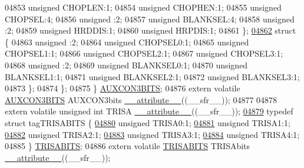 \begin{DoxyCode}
04853       \textcolor{keywordtype}{unsigned} CHOPLEN:1;
04854       \textcolor{keywordtype}{unsigned} CHOPHEN:1;
04855       \textcolor{keywordtype}{unsigned} CHOPSEL:4;
04856       \textcolor{keywordtype}{unsigned} :2;
04857       \textcolor{keywordtype}{unsigned} BLANKSEL:4;
04858       \textcolor{keywordtype}{unsigned} :2;
04859       \textcolor{keywordtype}{unsigned} HRDDIS:1;
04860       \textcolor{keywordtype}{unsigned} HRPDIS:1;
04861     \};
\hypertarget{a00009_source_l04862}{}\hyperlink{a00009}{04862}     \textcolor{keyword}{struct }\{
04863       \textcolor{keywordtype}{unsigned} :2;
04864       \textcolor{keywordtype}{unsigned} CHOPSEL0:1;
04865       \textcolor{keywordtype}{unsigned} CHOPSEL1:1;
04866       \textcolor{keywordtype}{unsigned} CHOPSEL2:1;
04867       \textcolor{keywordtype}{unsigned} CHOPSEL3:1;
04868       \textcolor{keywordtype}{unsigned} :2;
04869       \textcolor{keywordtype}{unsigned} BLANKSEL0:1;
04870       \textcolor{keywordtype}{unsigned} BLANKSEL1:1;
04871       \textcolor{keywordtype}{unsigned} BLANKSEL2:1;
04872       \textcolor{keywordtype}{unsigned} BLANKSEL3:1;
04873     \};
04874   \};
04875 \} \hyperlink{a00008_d2/da3/a00115}{AUXCON3BITS};
04876 \textcolor{keyword}{extern} \textcolor{keyword}{volatile} \hyperlink{a00008_d2/da3/a00115}{AUXCON3BITS} AUXCON3bits \hyperlink{a00009_a493c46f03454991ccc5aa7a6e1dfb2a7}{\_\_attribute\_\_}((\_\_sfr\_\_));
04877 
04878 \textcolor{keyword}{extern} \textcolor{keyword}{volatile} \textcolor{keywordtype}{unsigned} \textcolor{keywordtype}{int}  TRISA \hyperlink{a00009_a493c46f03454991ccc5aa7a6e1dfb2a7}{\_\_attribute\_\_}((\_\_sfr\_\_));
\hypertarget{a00009_source_l04879}{}\hyperlink{a00008}{04879} \textcolor{keyword}{typedef} \textcolor{keyword}{struct }tagTRISABITS \{
\hypertarget{a00009_source_l04880}{}\hyperlink{a00008_a5b058659efa978bacb96a404cfdbe610}{04880}   \textcolor{keywordtype}{unsigned} TRISA0:1;
\hypertarget{a00009_source_l04881}{}\hyperlink{a00008_ab129bf45a7e3be70a0acfea93d291273}{04881}   \textcolor{keywordtype}{unsigned} TRISA1:1;
\hypertarget{a00009_source_l04882}{}\hyperlink{a00008_af6281130cf7baba87c8550bd35d9d76d}{04882}   \textcolor{keywordtype}{unsigned} TRISA2:1;
\hypertarget{a00009_source_l04883}{}\hyperlink{a00008_a1a2488028e463b824d503f740b999146}{04883}   \textcolor{keywordtype}{unsigned} TRISA3:1;
\hypertarget{a00009_source_l04884}{}\hyperlink{a00008_a9f5eacb9cb6d29d89451ce640a6057ae}{04884}   \textcolor{keywordtype}{unsigned} TRISA4:1;
04885 \} \hyperlink{a00008_dc/d1b/a00827}{TRISABITS};
04886 \textcolor{keyword}{extern} \textcolor{keyword}{volatile} \hyperlink{a00008_dc/d1b/a00827}{TRISABITS} TRISAbits \hyperlink{a00009_a493c46f03454991ccc5aa7a6e1dfb2a7}{\_\_attribute\_\_}((\_\_sfr\_\_));

\end{DoxyCode}
